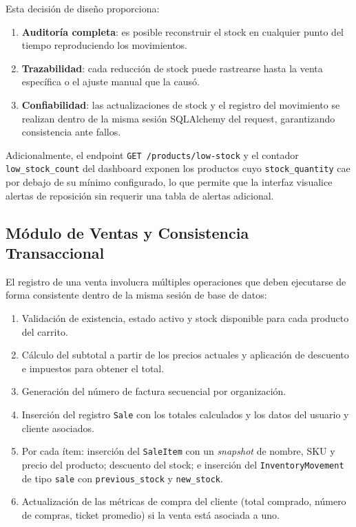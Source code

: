 Esta decisión de diseño proporciona:

\begin{enumerate}
\def\labelenumi{\arabic{enumi}.}
\tightlist
\item
  \textbf{Auditoría completa}: es posible reconstruir el stock en cualquier punto del tiempo reproduciendo los movimientos.
\item
  \textbf{Trazabilidad}: cada reducción de stock puede rastrearse hasta la venta específica o el ajuste manual que la causó.
\item
  \textbf{Confiabilidad}: las actualizaciones de stock y el registro del movimiento se realizan dentro de la misma sesión SQLAlchemy del request, garantizando consistencia ante fallos.
\end{enumerate}

Adicionalmente, el endpoint \texttt{GET\ /products/low-stock} y el contador \texttt{low\_stock\_count} del dashboard exponen los productos cuyo \texttt{stock\_quantity} cae por debajo de su mínimo configurado, lo que permite que la interfaz visualice alertas de reposición sin requerir una tabla de alertas adicional.

\subsection{Módulo de Ventas y Consistencia Transaccional}\label{muxf3dulo-de-ventas-y-consistencia-transaccional}

El registro de una venta involucra múltiples operaciones que deben ejecutarse de forma consistente dentro de la misma sesión de base de datos:

\begin{enumerate}
\def\labelenumi{\arabic{enumi}.}
\tightlist
\item
  Validación de existencia, estado activo y stock disponible para cada producto del carrito.
\item
  Cálculo del subtotal a partir de los precios actuales y aplicación de descuento e impuestos para obtener el total.
\item
  Generación del número de factura secuencial por organización.
\item
  Inserción del registro \texttt{Sale} con los totales calculados y los datos del usuario y cliente asociados.
\item
  Por cada ítem: inserción del \texttt{SaleItem} con un \emph{snapshot} de nombre, SKU y precio del producto; descuento del stock; e inserción del \texttt{InventoryMovement} de tipo \texttt{sale} con \texttt{previous\_stock} y \texttt{new\_stock}.
\item
  Actualización de las métricas de compra del cliente (total comprado, número de compras, ticket promedio) si la venta está asociada a uno.
\end{enumerate}

